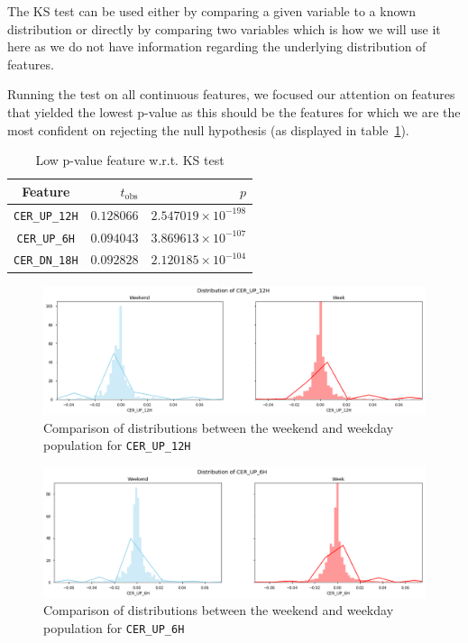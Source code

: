 The KS test can be used either by comparing a given variable to a known distribution or directly by comparing two variables which is how we will use it here as we do not have information regarding the underlying distribution of features. 

Running the test on all continuous features, we focused our attention on features that yielded the lowest p-value as this should be the features for which we are the most confident on rejecting the null hypothesis (as displayed in table~\ref{lowest}). 

\begin{table}[h]
\begin{center}
\begin{tabular}{c r r}
\hline
\textbf{Feature} & \textbf{$t_\text{obs}$} & $p$\\ 
\hline\hline
\texttt{CER\_UP\_12H} & $0.128066$ &	 $2.547019\times 10^{-198}$\\
\hline
\texttt{CER\_UP\_6H} &  $0.094043$ & $3.869613\times 10^{-107}$\\
\hline
\texttt{CER\_DN\_18H} & $0.092828$ &	 $2.120185\times 10^{-104}$\\
\end{tabular}
\end{center}
\caption{\label{lowest}Low p-value feature w.r.t. KS test}
\end{table}

\begin{figure}[ht]
    \begin{center}
    \includegraphics[width=1\linewidth]{images/KS_CER_UP_12.png}    
    \end{center}
    \caption{Comparison of distributions between the weekend and weekday population for \texttt{CER\_UP\_12H}}
    \label{KS_CER_UP_12}
\end{figure}

\begin{figure}[ht]
    \begin{center}
    \includegraphics[width=1\linewidth]{images/KS_CER_UP_6.png}    
    \end{center}
    \caption{Comparison of distributions between the weekend and weekday population for \texttt{CER\_UP\_6H}}
    \label{KS_CER_UP_6}
\end{figure}

